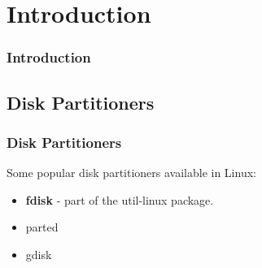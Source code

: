 
\section{Introduction}
\begin{frame}\frametitle{Introduction}

\end{frame}

\subsection{Disk Partitioners}
\begin{frame}\frametitle{Disk Partitioners}
Some popular disk partitioners available in Linux:
\begin{itemize}
\item \textbf{fdisk} - part of the util-linux package.
\item parted
\item gdisk
\end{itemize}
\end{frame}
